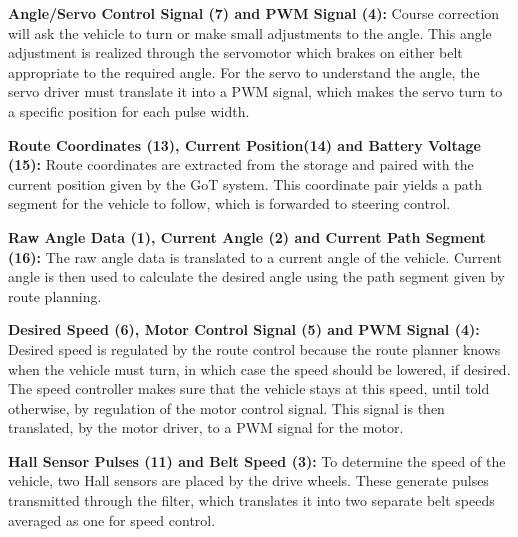 \textbf{Angle/Servo Control Signal (7) and PWM Signal (4):}
Course correction will ask the vehicle to turn or make small adjustments to the angle. This angle adjustment is realized through the servomotor which brakes on either belt appropriate to the required angle. For the servo to understand the angle, the servo driver must translate it into a PWM signal, which makes the servo turn to a specific position for each pulse width.

\textbf{Route Coordinates (13), Current Position(14) and Battery Voltage (15):}
Route coordinates are extracted from the storage and paired with the current position given by the GoT system. This coordinate pair yields a path segment for the vehicle to follow, which is forwarded to steering control.

\textbf{Raw Angle Data (1), Current Angle (2) and Current Path Segment (16):}
The raw angle data is translated to a current angle of the vehicle. Current angle is then used to calculate the desired angle using the path segment given by route planning.

\textbf{Desired Speed (6), Motor Control Signal (5) and PWM Signal (4):}
Desired speed is regulated by the route control because the route planner knows when the vehicle must turn, in which case the speed should be lowered, if desired. The speed controller makes sure that the vehicle stays at this speed, until told otherwise, by regulation of the motor control signal. This signal is then translated, by the motor driver, to a PWM signal for the motor.

\textbf{Hall Sensor Pulses (11) and Belt Speed (3):}
To determine the speed of the vehicle, two Hall sensors are placed by the drive wheels. These generate pulses transmitted through the filter, which translates it into two separate belt speeds averaged as one for speed control.



%
%

